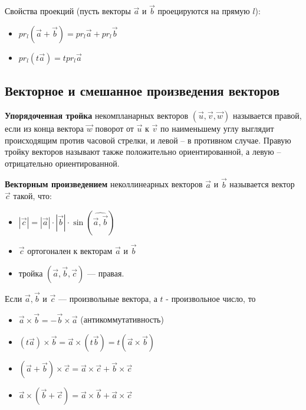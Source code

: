 \documentclass[a4paper]{article}
\begin{document}
    Свойства проекций (пусть векторы $\vec{a}$ и $\vec{b}$ проецируются на прямую $l$):
    \begin{itemize}
        \item $pr_l (\vec{a} + \vec{b}) = pr_l \vec{a} + pr_l \vec{b}$
        \item $pr_l (t \vec{a}) = t pr_l \vec{a}$
    \end{itemize}


    \newpage \begin{center}
                 \begin{Large}
                 \end{Large}
    \end{center}
    \subsection*{Векторное и смешанное произведения векторов}

    \textbf{Упорядоченная тройка} некомпланарных векторов $(\vec{u}, \vec{v}, \vec{w})$  называется
    правой, если из конца вектора $\vec{w}$ поворот от $\vec{u}$ к $\vec{v}$ по наименьшему углу
    выглядит происходящим против часовой стрелки, и левой – в противном случае. Правую тройку векторов называют также положительно
    ориентированной, а левую – отрицательно ориентированной.

    \textbf{Векторным произведением} неколлинеарных векторов $\vec{a}$ и $\vec{b}$ называется
    вектор $\vec{c}$ такой, что:
    \begin{itemize}
        \item $| \vec{c}| = | \vec{a} | \cdot | \vec{b} | \cdot \sin (\widehat{\vec{a}, \vec{b}})$
        \item $\vec{c}$ ортогонален к векторам $\vec{a}$ и $\vec{b}$
        \item тройка $(\vec{a}, \vec{b}, \vec{c})$ --- правая.
    \end{itemize}

    Если $\vec{a}, \vec{b}$ и $\vec{c}$ --- произвольные вектора, а $t$ - произвольное число, то
    \begin{itemize}
        \item $\vec{a} \times \vec{b} = -\vec{b} \times \vec{a}$ (антикоммутативность)
        \item $(t \vec{a}) \times \vec{b} = \vec{a} \times (t \vec{b}) = t ( \vec{a} \times \vec{b})$
        \item $(\vec{a} +\vec{b}) \times \vec{c} = \vec{a} \times \vec{c} + \vec{b} \times \vec{c}$
        \item $\vec{a} \times (\vec{b} + \vec{c}) = \vec{a} \times \vec{b} +\vec{a} \times \vec{c}$
    \end{itemize}
\end{document}
